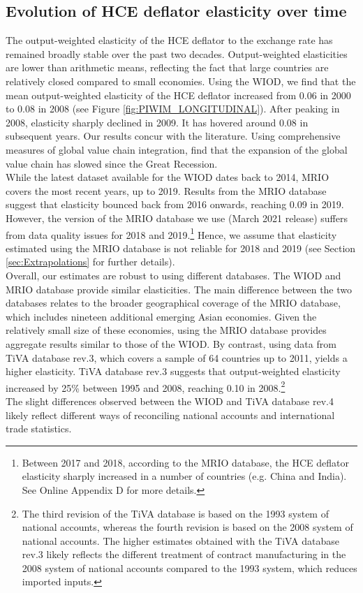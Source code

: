 \documentclass[11pt,a4paper]{paper} %
\begin{document}
\subsection{Evolution of HCE deflator elasticity over time}\label{subsec:timeevol}
The output-weighted elasticity of the HCE deflator to the exchange rate has remained broadly stable over the past two decades.
Output-weighted elasticities are lower than arithmetic means, reflecting the fact that large countries are relatively closed compared to small economies.
Using the WIOD, we find that the mean output-weighted elasticity of the HCE deflator increased from 0.06 in 2000 to 0.08 in 2008 (see Figure \ref{fig:PIWIM_LONGITUDINAL}). 
After peaking in 2008, elasticity sharply declined in 2009. It has hovered around 0.08 in subsequent years. 
Our results concur with the literature.
Using comprehensive measures of global value chain integration, \cite{Timmer2016} find that the expansion of the global value chain has slowed since the Great Recession.\\
While the latest dataset available for the WIOD dates back to 2014, MRIO covers the most recent years, up to 2019. 
Results from the MRIO database suggest that elasticity bounced back from 2016 onwards, reaching 0.09 in 2019.
However, the version of the MRIO database we use (March 2021 release) suffers from data quality issues for 2018 and 2019.\footnote{Between 2017 and 2018, according to the MRIO database, the HCE deflator elasticity sharply increased in a number of countries (e.g. China and India). See Online Appendix D for more details.} 
Hence, we assume that elasticity estimated using the MRIO database is not reliable for 2018 and 2019 (see Section \ref{sec:Extrapolations} for further details).\\
Overall, our estimates are robust to using different databases.
The WIOD and MRIO database provide similar elasticities. 
The main difference between the two databases relates to the broader geographical coverage of the MRIO database, which includes nineteen additional emerging Asian economies. 
Given the relatively small size of these economies, using the MRIO database provides aggregate results similar to those of the WIOD.
By contrast, using data from TiVA database rev.3, which covers a sample of 64 countries up to 2011, yields a higher elasticity. 
TiVA database rev.3 suggests that output-weighted elasticity increased by 25\% between 1995 and 2008, reaching 0.10 in 2008.\footnote{The third revision of the TiVA database is based on the 1993 system of national accounts, whereas the fourth revision is based on the 2008 system of national accounts. The higher estimates obtained with the TiVA database rev.3 likely reflects the different treatment of contract manufacturing in the 2008 system of national accounts compared to the 1993 system, which reduces imported inputs.} \\
The slight differences observed between the WIOD and TiVA database rev.4 likely reflect different ways of reconciling national accounts and international trade statistics.
\end{document}

